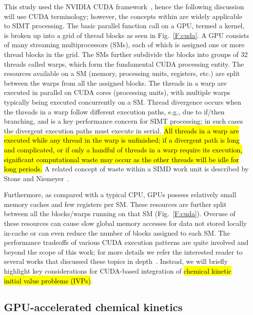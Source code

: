 \documentclass[preprint,review,11pt]{elsarticle}
\DeclareRobustCommand{\hlg}[1]{\sethlcolor{green}\hl{#1}}
\begin{document}
This study used the NVIDIA CUDA framework~\cite{Buck:2008aa,NVIDIA:2015aa}, hence the following discussion will use CUDA terminology; however, the concepts within are widely applicable to SIMT processing.
The basic parallel function call on a GPU, termed a kernel, is broken up into a grid of thread blocks as seen in Fig.~\ref{F:cuda}.
A GPU consists of many streaming multiprocessors (SMs), each of which is assigned one or more thread blocks in the grid.
The SMs further subdivide the blocks into groups of \num{32} threads called warps, which form the fundamental CUDA processing entity.
The resources available on a SM (memory, processing units, registers, etc.) are split between the warps from all the assigned blocks.
The threads in a warp are executed in parallel on CUDA cores (processing units), with multiple warps typically being executed concurrently on a SM.
Thread divergence occurs when the threads in a warp follow different execution paths, e.g., due to if\slash then branching, and is a key performance concern for SIMT processing; in such cases the divergent execution paths must execute in serial.
\hlg{All threads in a warp are executed while any thread in the warp is unfinished; if a divergent path is long and complicated, or if only a handful of threads in a warp require its execution, significant computational waste may occur as the other threads will be idle for long periods.}
A related concept of waste within a SIMD work unit is described by Stone and Niemeyer~\cite{2016arXiv160805794S}.

Furthermore, as compared with a typical CPU, GPUs possess relatively small memory caches and few registers per SM.
These resources are further split between all the blocks\slash warps running on that SM (Fig.~\ref{F:cuda}).
Overuse of these resources can cause slow global memory accesses for data not stored locally in-cache or can even reduce the number of blocks assigned to each SM.
The performance tradeoffs of various CUDA execution patterns are quite involved and beyond the scope of this work; for more details we refer the interested reader to several works that discussed these topics in depth~\cite{Cruz:2011gc,Brodtkorb:2013hn,Niemeyer:2014hn}.
Instead, we will briefly highlight key considerations for CUDA-based integration of \hlg{chemical kinetic initial value problems (IVPs)}.

\subsection{GPU-accelerated chemical kinetics}
\end{document}
